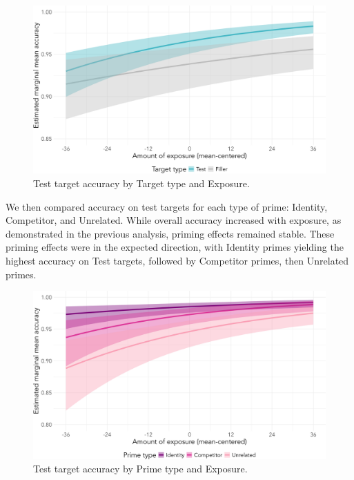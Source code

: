 \documentclass[
  12pt,
  twoside]{article}
\begin{document}
\begin{figure}[H]

{\centering \includegraphics[width=\textwidth]{sections/code/outputs/behave_plot} 

}

\caption{Test target accuracy by Target type and Exposure.}\label{fig:behave-fig}
\end{figure}

We then compared accuracy on test targets for each type of prime: Identity, Competitor, and Unrelated.
While overall accuracy increased with exposure, as demonstrated in the previous analysis, priming effects remained stable.
These priming effects were in the expected direction, with Identity primes yielding the highest accuracy on Test targets, followed by Competitor primes, then Unrelated primes.

\begin{figure}[H]

{\centering \includegraphics[width=\textwidth]{sections/code/outputs/test_plot} 

}

\caption{Test target accuracy by Prime type and Exposure.}\label{fig:test-fig}
\end{figure}
\end{document}
